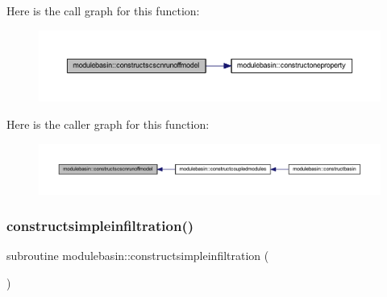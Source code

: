 Here is the call graph for this function\+:\nopagebreak
\begin{figure}[H]
\begin{center}
\leavevmode
\includegraphics[width=350pt]{namespacemodulebasin_a5a5342d9e5be44e9161d8d4643071661_cgraph}
\end{center}
\end{figure}
Here is the caller graph for this function\+:\nopagebreak
\begin{figure}[H]
\begin{center}
\leavevmode
\includegraphics[width=350pt]{namespacemodulebasin_a5a5342d9e5be44e9161d8d4643071661_icgraph}
\end{center}
\end{figure}
\mbox{\label{namespacemodulebasin_a0b7274cf3bbde399251125f839f59767}} 
\subsubsection{\texorpdfstring{constructsimpleinfiltration()}{constructsimpleinfiltration()}}
{\footnotesize\ttfamily subroutine modulebasin\+::constructsimpleinfiltration (\begin{DoxyParamCaption}{ }\end{DoxyParamCaption})\hspace{0.3cm}{\ttfamily [private]}}

